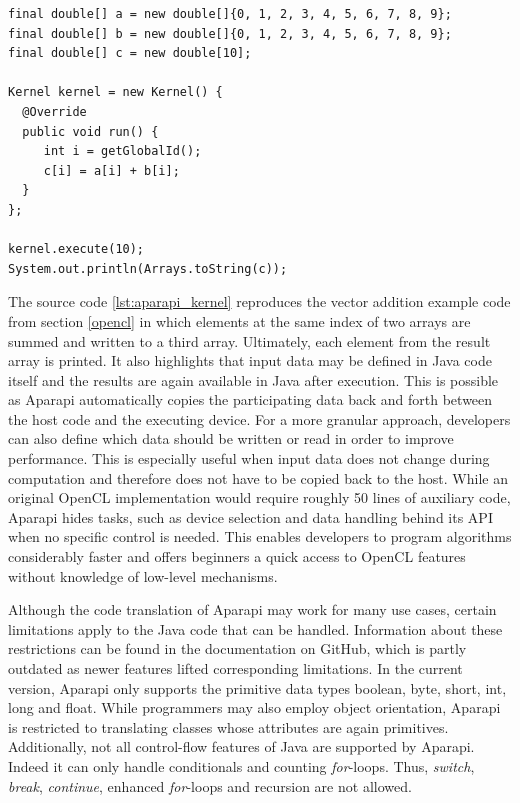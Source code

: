 \begin{minipage}{\linewidth}
\begin{lstlisting}[caption=Aparapi Vector Addition Kernel,captionpos=b,label=lst:aparapi_kernel]
final double[] a = new double[]{0, 1, 2, 3, 4, 5, 6, 7, 8, 9};
final double[] b = new double[]{0, 1, 2, 3, 4, 5, 6, 7, 8, 9};
final double[] c = new double[10];

Kernel kernel = new Kernel() {
  @Override
  public void run() {
     int i = getGlobalId();
     c[i] = a[i] + b[i];
  }
};

kernel.execute(10);
System.out.println(Arrays.toString(c));
\end{lstlisting}
\end{minipage}
The source code \ref{lst:aparapi_kernel} reproduces the vector addition example code from section \ref{opencl} in which elements at the same index of two arrays are summed and written to a third array. Ultimately, each element from the result array is printed. It also highlights that input data may be defined in Java code itself and the results are again available in Java after execution. This is possible as Aparapi automatically copies the participating data back and forth between the host code and the executing device. For a more granular approach, developers can also define which data should be written or read in order to improve performance. This is especially useful when input data does not change during computation and therefore does not have to be copied back to the host. While an original OpenCL implementation would require roughly 50 lines of auxiliary code, Aparapi hides tasks, such as device selection and data handling behind its API when no specific control is needed. This enables developers to program algorithms considerably faster and offers beginners a quick access to OpenCL features without knowledge of low-level mechanisms.

Although the code translation of Aparapi may work for many use cases, certain limitations apply to the Java code that can be handled. Information about these restrictions can be found in the documentation on GitHub\cite{aparapi_kernel_guidelines}, which is partly outdated as newer features lifted corresponding limitations. In the current version, Aparapi only supports the primitive data types boolean, byte, short, int, long and float. While programmers may also employ object orientation, Aparapi is restricted to translating classes whose attributes are again primitives. Additionally, not all control-flow features of Java are supported by Aparapi. Indeed it can only handle conditionals and counting \textit{for}-loops. Thus, \textit{switch}, \textit{break}, \textit{continue}, enhanced \textit{for}-loops and recursion are not allowed.
